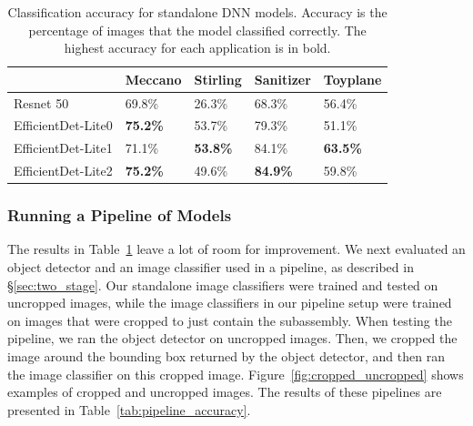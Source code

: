 \begin{table}
\begin{tabular}{|l||l|l|l|l|}
\hline
  & Meccano & Stirling & Sanitizer & Toyplane\\
  \hline
  \hline
  Resnet 50 & 69.8\% & 26.3\% & 68.3\% & 56.4\%\\
  EfficientDet-Lite0 & \textbf{75.2\%} & 53.7\% & 79.3\% & 51.1\%\\
  EfficientDet-Lite1 & 71.1\% & \textbf{53.8\%} & 84.1\% & \textbf{63.5\%}\\
  EfficientDet-Lite2 & \textbf{75.2\%} & 49.6\% & \textbf{84.9\%} & 59.8\%\\
  \hline
\end{tabular}
  \caption{
    Classification accuracy for standalone DNN models.
    Accuracy is the percentage of images that the model classified correctly.
    The highest accuracy for each application is in bold.
  }\label{tab:standalone_accuracy}
\end{table}

\subsubsection{Running a Pipeline of Models}

The results in Table~\ref{tab:standalone_accuracy} leave a lot of room for
improvement.
We next evaluated an object detector and an image classifier used in a pipeline,
as described in \S\ref{sec:two_stage}.
Our standalone image classifiers were trained and tested
on uncropped images, while the image classifiers in our pipeline setup were
trained on images that were cropped to just contain the subassembly.
When testing the pipeline, we ran the object detector on uncropped images.
Then, we cropped the image around the bounding box returned by the object
detector, and then ran the image classifier on this cropped image.
Figure~\ref{fig:cropped_uncropped} shows examples of cropped and uncropped
images.
The results of these pipelines are presented in
Table~\ref{tab:pipeline_accuracy}.

